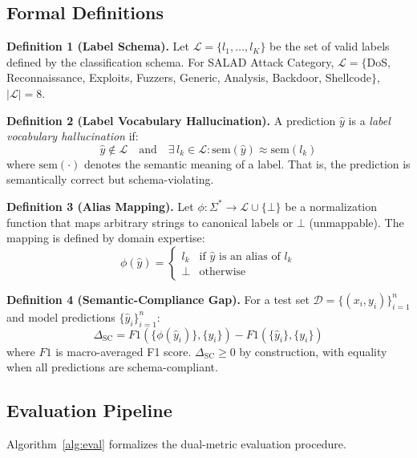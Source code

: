 \documentclass[journal]{IEEEtran}
\begin{document}
\subsection{Formal Definitions}

\noindent\textbf{Definition 1 (Label Schema).} Let $\mathcal{L} = \{l_1, \ldots, l_K\}$ be the set of valid labels defined by the classification schema. For SALAD Attack Category, $\mathcal{L} = \{$DoS, Reconnaissance, Exploits, Fuzzers, Generic, Analysis, Backdoor, Shellcode$\}$, $|\mathcal{L}| = 8$.

\noindent\textbf{Definition 2 (Label Vocabulary Hallucination).} A prediction $\hat{y}$ is a \emph{label vocabulary hallucination} if:
\begin{equation}
\hat{y} \notin \mathcal{L} \quad \text{and} \quad \exists\, l_k \in \mathcal{L} : \text{sem}(\hat{y}) \approx \text{sem}(l_k)
\end{equation}
where $\text{sem}(\cdot)$ denotes the semantic meaning of a label. That is, the prediction is semantically correct but schema-violating.

\noindent\textbf{Definition 3 (Alias Mapping).} Let $\phi: \Sigma^* \to \mathcal{L} \cup \{\bot\}$ be a normalization function that maps arbitrary strings to canonical labels or $\bot$ (unmappable). The mapping is defined by domain expertise:
\begin{equation}
\phi(\hat{y}) = \begin{cases}
l_k & \text{if } \hat{y} \text{ is an alias of } l_k \\
\bot & \text{otherwise}
\end{cases}
\end{equation}

\noindent\textbf{Definition 4 (Semantic-Compliance Gap).} For a test set $\mathcal{D} = \{(x_i, y_i)\}_{i=1}^n$ and model predictions $\{\hat{y}_i\}_{i=1}^n$:
\begin{equation}
\Delta_\text{SC} = F1(\{\phi(\hat{y}_i)\}, \{y_i\}) - F1(\{\hat{y}_i\}, \{y_i\})
\end{equation}
where $F1$ is macro-averaged F1 score. $\Delta_\text{SC} \geq 0$ by construction, with equality when all predictions are schema-compliant.

\subsection{Evaluation Pipeline}
Algorithm~\ref{alg:eval} formalizes the dual-metric evaluation procedure.
\end{document}
